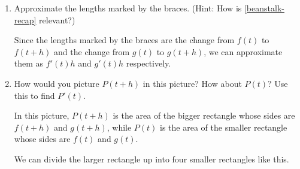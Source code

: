 \documentclass{article}
\begin{document}
\begin{enumerate}
\begin{enumerate}
    \begin{enumerate}
    \item \label{product-rule-lengths}

      \begin{problem}[0.5in]
        Approximate the lengths marked by the braces. (Hint: How is \ref{beanstalk-recap} relevant?) 
      \end{problem}

      \begin{solution}
        Since the lengths marked by the braces are the change from $f(t)$ to $f(t+h)$ and
        the change from $g(t)$ to $g(t+h)$, we can approximate them as $f'(t)h$ and $g'(t)h$
        respectively.
      \end{solution}

    \item
      \begin{problem}[\vfill]
        How would you picture $P(t + h)$ in this picture? How about $P(t)$? Use this to find $P'(t)$.
      \end{problem}

      \begin{solution}
        In this picture, $P(t+h)$ is the area of the bigger rectangle whose sides are $f(t+h)$
        and $g(t+h)$, while $P(t)$ is the area of the smaller rectangle whose
        sides are $f(t)$ and $g(t)$. 

        We can divide the larger rectangle up into four smaller rectangles like this.
        


\end{solution}
\end{enumerate}
\end{enumerate}
\end{enumerate}
\end{document}
